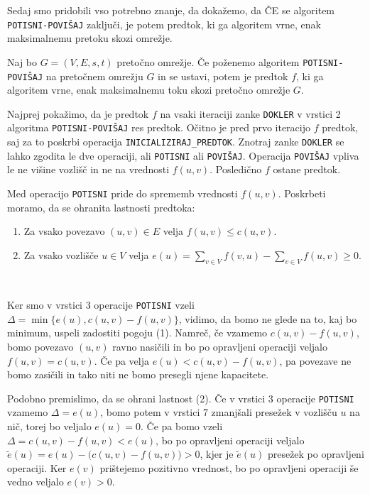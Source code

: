 \documentclass[mat1]{fmfdelo}
\begin{document}
Sedaj smo pridobili vso potrebno znanje, da dokažemo, da ČE se algoritem \texttt{POTISNI-POVIŠAJ} zaključi, je potem predtok, ki ga algoritem vrne, enak maksimalnemu pretoku skozi omrežje.

\begin{izrek}
Naj bo $G=(V,E,s,t)$ pretočno omrežje. Če poženemo algoritem \texttt{POTISNI-POVIŠAJ} na pretočnem omrežju $G$ in se ustavi, potem je predtok $f$, ki ga algoritem vrne, enak maksimalnemu toku skozi pretočno omrežje $G$.
\end{izrek}

\begin{dokaz}
Najprej pokažimo, da je predtok $f$ na vsaki iteraciji zanke \texttt{DOKLER} v vrstici 2 algoritma \texttt{POTISNI-POVIŠAJ} res predtok. Očitno je pred prvo iteracijo $f$ predtok, saj za to poskrbi operacija \texttt{INICIALIZIRAJ\_PREDTOK}. Znotraj zanke \texttt{DOKLER} se lahko zgodita le dve operaciji, ali \texttt{POTISNI} ali \texttt{POVIŠAJ}. Operacija \texttt{POVIŠAJ} vpliva le ne višine vozlišč in ne na vrednosti $f(u,v)$. Posledično $f$ ostane predtok.

Med operacijo \texttt{POTISNI} pride do sprememb vrednosti $f(u,v)$. Poskrbeti moramo, da se ohranita lastnosti predtoka:\\

\begin{enumerate}
\item Za vsako povezavo $(u,v) \in E$ velja $f(u,v) \leq c(u,v)$.
\item Za vsako vozlišče $u \in V$ velja $e(u) = \sum_{v\in V} f(v,u) - \sum_{v\in V} f(u,v) \geq 0$.
\end{enumerate}~

Ker smo v vrstici 3 operacije \texttt{POTISNI} vzeli $\Delta = \min\{e(u), c(u,v) - f(u,v)\}$, vidimo, da bomo ne glede na to, kaj bo minimum, uspeli zadostiti pogoju (1). Namreč, če vzamemo $c(u,v) - f(u,v)$, bomo povezavo $(u,v)$ ravno nasičili in bo po opravljeni operaciji veljalo $f(u,v) = c(u,v)$. Če pa velja $e(u) < c(u,v) - f(u,v)$, pa povezave ne bomo zasičili in tako niti ne bomo presegli njene kapacitete.

Podobno premislimo, da se ohrani lastnost (2). Če v vrstici 3 operacije \texttt{POTISNI} vzamemo $\Delta = e(u)$, bomo potem v vrstici 7 zmanjšali presežek v vozlišču $u$ na nič, torej bo veljalo $e(u) = 0$. Če pa bomo vzeli $\Delta = c(u,v) - f(u,v) < e(u)$, bo po opravljeni operaciji veljalo $\tilde{e}(u) = e(u) - \big(c(u,v) - f(u,v)\big) > 0$, kjer je $\tilde{e}(u)$ presežek po opravljeni operaciji. Ker $e(v)$ prištejemo pozitivno vrednost, bo po opravljeni operaciji še vedno veljalo $e(v) > 0$.\\


\end{dokaz}
\end{document}
